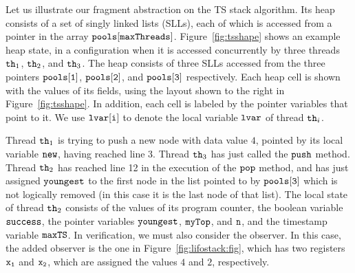 Let us illustrate our fragment abstraction on the TS stack algorithm.
Its heap consists of a set of singly linked lists (SLLs), each of which
is accessed from a pointer in the array ${\tt pools[maxThreads]}$.
Figure~\ref{fig:tsshape} shows an example heap state,
in a configuration when %
it is accessed concurrently by three threads ${\tt th}_1$, ${\tt th}_2$, and ${\tt th}_3$. The heap consists of three SLLs accessed from the three pointers $\tt pools[1]$, $\tt pools[2]$, and $\tt pools[3]$ respectively. Each heap cell is
shown with the values of its fields, using the layout shown to the right in
Figure~\ref{fig:tsshape}.
In addition, each cell is labeled by the
pointer variables that point to it. We use ${\tt lvar[i]}$ to denote the local
variable ${\tt lvar}$ of thread ${\tt th}_i$.

Thread ${\tt th}_1$ is trying to push a new node with data value $4$, pointed by its local variable $\tt new$, having reached line 3.
Thread ${\tt th}_3$ has just called the ${\tt push}$ method.
Thread ${\tt th}_2$ has reached line 12 in the execution of the ${\tt pop}$ method,  and has just assigned ${\tt youngest}$ to the first node in the list
pointed to by $\tt pools[3]$ which is not logically removed (in this case it is the last node of that list).
The local state of thread ${\tt th}_2$
consists of the values of its program counter, the boolean variable ${\tt success}$, the pointer variables ${\tt youngest}$, ${\tt myTop}$, and ${\tt n}$,
and the timestamp variable ${\tt maxTS}$.
In verification, we must also consider the observer. In this case, the added
observer is the one in Figure~\ref{fig:lifostack:fig}, which has two registers
$\tt x_1$ and $\tt x_2$, which are assigned the values $4$ and $2$,
respectively.




